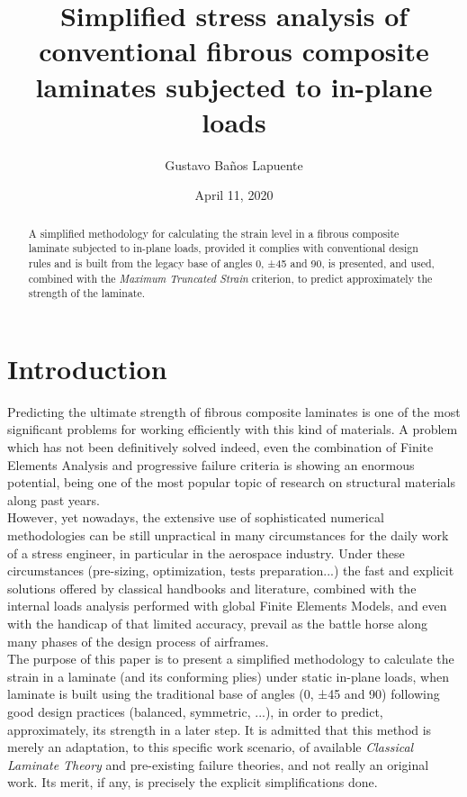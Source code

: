 \documentclass[a4paper,11pt]{article}
\begin{document}
	
\title{Simplified stress analysis of conventional fibrous composite laminates subjected to in-plane loads}
\author{Gustavo Baños Lapuente}
\renewcommand\Affilfont{\itshape\small}
\date{April 11, 2020}
\maketitle


\begin{abstract}
	A simplified methodology for calculating the strain level in a fibrous composite laminate subjected to in-plane loads, provided it complies with conventional design rules and is built from the legacy base of angles 0\textdegree, ±45\textdegree{} and 90\textdegree, is presented, and used, combined with the \emph{Maximum Truncated Strain} criterion, to predict approximately the strength of the laminate.
\end{abstract}


\section{Introduction}

Predicting the ultimate strength of fibrous composite laminates is one of the most significant problems for working efficiently with this kind of materials. A problem which has not been definitively solved indeed, even the combination of Finite Elements Analysis and progressive failure criteria is showing an enormous potential, being one of the most popular topic of research on structural materials along past years.
\\

However, yet nowadays, the extensive use of sophisticated numerical methodologies can be still unpractical in many circumstances for the daily work of a stress engineer, in particular in the aerospace industry. Under these circumstances (pre-sizing, optimization, tests preparation...) the fast and explicit solutions offered by classical handbooks and literature, combined with the internal loads analysis performed with global Finite Elements Models, and even with the handicap of that limited accuracy, prevail as the battle horse along many phases of the design process of airframes. 
\\

The purpose of this paper is to present a simplified methodology to calculate the strain in a laminate (and its conforming plies) under static in-plane loads, when laminate is built using the traditional base of angles (0\textdegree, ±45\textdegree{} and 90\textdegree) following good design practices (balanced, symmetric, ...), in order to predict, approximately, its strength in a later step. It is admitted that this method is merely an adaptation, to this specific work scenario, of available \emph{Classical Laminate Theory} and pre-existing failure theories, and not really an original work. Its merit, if any, is precisely the explicit simplifications done. 
\\
\end{document}
